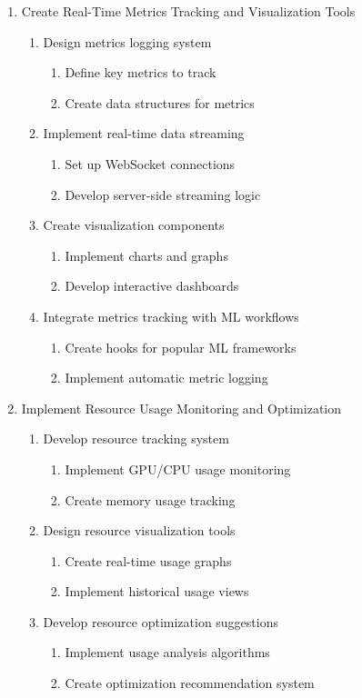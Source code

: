 \documentclass[12pt]{article}
\begin{document}
\begin{enumerate}
    \item Create Real-Time Metrics Tracking and Visualization Tools
    \begin{enumerate}
        \item Design metrics logging system
        \begin{enumerate}
            \item Define key metrics to track
            \item Create data structures for metrics
        \end{enumerate}
        \item Implement real-time data streaming
        \begin{enumerate}
            \item Set up WebSocket connections
            \item Develop server-side streaming logic
        \end{enumerate}
        \item Create visualization components
        \begin{enumerate}
            \item Implement charts and graphs
            \item Develop interactive dashboards
        \end{enumerate}
        \item Integrate metrics tracking with ML workflows
        \begin{enumerate}
            \item Create hooks for popular ML frameworks
            \item Implement automatic metric logging
        \end{enumerate}
    \end{enumerate}

    \item Implement Resource Usage Monitoring and Optimization
    \begin{enumerate}
        \item Develop resource tracking system
        \begin{enumerate}
            \item Implement GPU/CPU usage monitoring
            \item Create memory usage tracking
        \end{enumerate}
        \item Design resource visualization tools
        \begin{enumerate}
            \item Create real-time usage graphs
            \item Implement historical usage views
        \end{enumerate}
        \item Develop resource optimization suggestions
        \begin{enumerate}
            \item Implement usage analysis algorithms
            \item Create optimization recommendation system
        \end{enumerate}
    \end{enumerate}


\end{enumerate}
\end{document}
